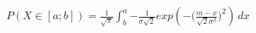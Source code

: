 \documentclass[preview]{standalone}
\begin{document}
\begin{align*}
P( X \in [a;b] ) = { \frac{1}{\sqrt{\pi}} } \int_b^a { { - \frac{1}{\sigma \sqrt{2}} } exp(-{ \Big( \frac{m - x}{\sqrt{2} \sigma^2} \Big)^2 }) } \, dx
\end{align*}
\end{document}
